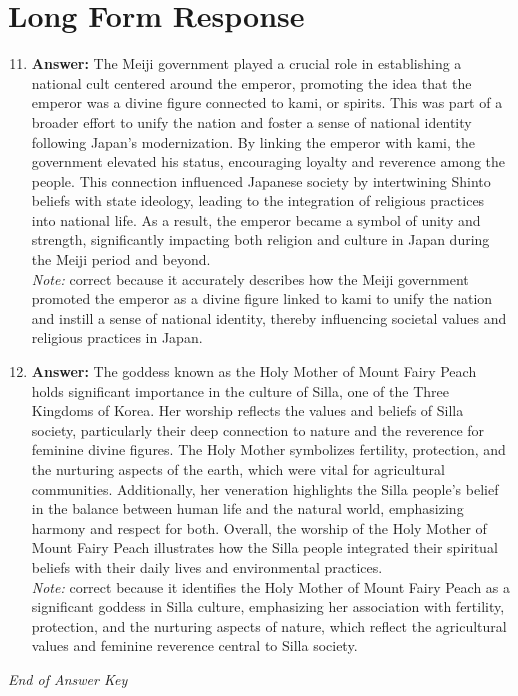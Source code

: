 \documentclass[12pt]{article}
\begin{document}
\section*{Long Form Response}
\begin{enumerate}[label=\arabic*.]
\setcounter{enumi}{10}
\item \textbf{Answer:} The Meiji government played a crucial role in establishing a national cult centered around the emperor, promoting the idea that the emperor was a divine figure connected to kami, or spirits. This was part of a broader effort to unify the nation and foster a sense of national identity following Japan's modernization. By linking the emperor with kami, the government elevated his status, encouraging loyalty and reverence among the people. This connection influenced Japanese society by intertwining Shinto beliefs with state ideology, leading to the integration of religious practices into national life. As a result, the emperor became a symbol of unity and strength, significantly impacting both religion and culture in Japan during the Meiji period and beyond.
\\ \textit{Note:} correct because it accurately describes how the Meiji government promoted the emperor as a divine figure linked to kami to unify the nation and instill a sense of national identity, thereby influencing societal values and religious practices in Japan.
\item \textbf{Answer:} The goddess known as the Holy Mother of Mount Fairy Peach holds significant importance in the culture of Silla, one of the Three Kingdoms of Korea. Her worship reflects the values and beliefs of Silla society, particularly their deep connection to nature and the reverence for feminine divine figures. The Holy Mother symbolizes fertility, protection, and the nurturing aspects of the earth, which were vital for agricultural communities. Additionally, her veneration highlights the Silla people's belief in the balance between human life and the natural world, emphasizing harmony and respect for both. Overall, the worship of the Holy Mother of Mount Fairy Peach illustrates how the Silla people integrated their spiritual beliefs with their daily lives and environmental practices.
\\ \textit{Note:} correct because it identifies the Holy Mother of Mount Fairy Peach as a significant goddess in Silla culture, emphasizing her association with fertility, protection, and the nurturing aspects of nature, which reflect the agricultural values and feminine reverence central to Silla society.
\end{enumerate}

\vfill
\noindent\textit{End of Answer Key}
\end{document}
